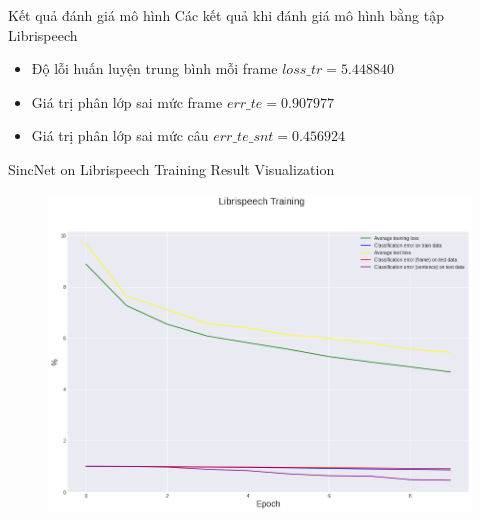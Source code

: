 \documentclass[notheorems, aspectratio=54]{beamer}
\begin{document}
\begin{frame}{Kết quả đánh giá mô hình}
	Các kết quả khi đánh giá mô hình bằng tập Librispeech
	\begin{itemize}
		\item Độ lỗi huấn luyện trung bình mỗi frame $loss\_tr=5.448840$
		\item Giá trị phân lớp sai mức frame $err\_te=0.907977$
		\item Giá trị phân lớp sai mức câu $err\_te\_snt =0.456924$
	\end{itemize}
\end{frame}
\begin{frame}{SincNet on Librispeech Training Result Visualization}
	\begin{figure}[H]
		\includegraphics[width=0.8\linewidth]{result/sincnet_librispeech_plot.png}
		\label{fig:writing-thesis}
	\end{figure}
\end{frame}
\end{document}
